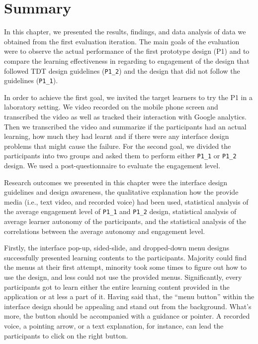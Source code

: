 
\section{Summary}

In this chapter, we presented the results, findings, and data analysis of data we obtained from the first evaluation iteration. The main goals of the evaluation were to observe the actual performance of the first prototype design (P1) and to compare the learning effectiveness in regarding to engagement of the design that followed TDT design guidelines (\verb|P1_2|) and the design that did not follow the guidelines (\verb|P1_1|). 

In order to achieve the first goal, we invited the target learners to try the P1 in a laboratory setting. We video recorded on the mobile phone screen and transcribed the video as well as tracked their interaction with Google analytics. Then we transcribed the video and summarize if the participants had an actual learning, how much they had learnt and if there were any interface design problems that might cause the failure. For the second goal, we divided the participants into two groups and asked them to perform either \verb|P1_1| or \verb|P1_2| design. We used a post-questionnaire to evaluate the engagement level. 

Research outcomes we presented in this chapter were the interface design guidelines and design awareness, the qualitative explanation how the provide media (i.e., text video, and recorded voice) had been used, statistical analysis of the average engagement level of \verb|P1_1| and \verb|P1_2| design, statistical analysis of average learner autonomy of the participants, and the statistical analysis of the correlations between the average autonomy and engagement level. 

Firstly, the interface pop-up, sided-slide, and dropped-down menu designs successfully presented learning contents to the participants. Majority could find the menus at their first attempt, minority took some times to figure out how to use the design, and less could not use the provided menus. Significantly, every participants got to learn either the entire learning content provided in the application or at less a part of it. Having said that, the ``menu button'' within the interface design should be appealing and stand out from the background. What's more, the button should be accompanied with a guidance or pointer. A recorded voice, a pointing arrow, or a text explanation, for instance, can lead the participants to click on the right button. 

